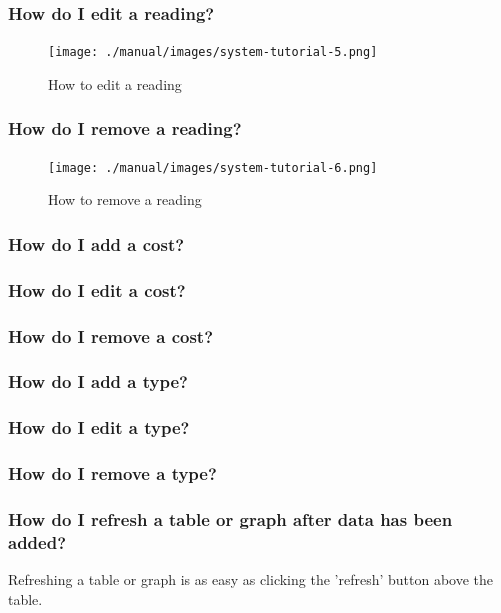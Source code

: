\subsubsection{How do I edit a reading?}
\begin{figure}[H]
	\texttt{[image: ./manual/images/system-tutorial-5.png]}
	\caption{How to edit a reading}
\end{figure}

\subsubsection{How do I remove a reading?}
\begin{figure}[H]
	\texttt{[image: ./manual/images/system-tutorial-6.png]}
	\caption{How to remove a reading}
\end{figure}

\subsubsection{How do I add a cost?}

\subsubsection{How do I edit a cost?}

\subsubsection{How do I remove a cost?}

\subsubsection{How do I add a type?}

\subsubsection{How do I edit a type?}

\subsubsection{How do I remove a type?}

\subsubsection{How do I refresh a table or graph after data has been added?}
Refreshing a table or graph is as easy as clicking the 'refresh' button above the table.

